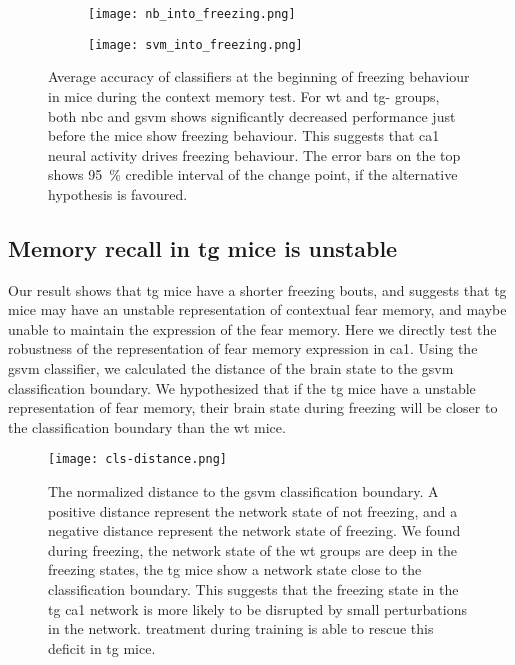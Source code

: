\begin{figure}[h]
    \begin{subfigure}[h]{\textwidth}
        \texttt{[image: nb\_into\_freezing.png]}
        \caption{\label{f.ad.nb_into_f}}
    \end{subfigure}
    \begin{subfigure}[h]{\textwidth}
        \texttt{[image: svm\_into\_freezing.png]}
        \caption{\label{f.ad.svm_into_f}}
    \end{subfigure}
    \caption[Average accuracy of classifiers at initiation of freezing behaviour.]{Average accuracy of classifiers at the beginning of freezing behaviour in mice during the context memory test. For \gls{wt} and \gls{tg}-\glu{} groups, both \gls{nbc} and \gls{gsvm} shows significantly decreased performance just before the mice show freezing behaviour. This suggests that \gls{ca1} neural activity drives freezing behaviour. The error bars on the top shows \SI{95}{\percent} credible interval of the change point, if the alternative hypothesis is favoured. \label{f.ad.into_f}}
\end{figure}

\subsection{Memory recall in \gls{tg} mice is unstable}
Our result shows that \gls{tg} mice have a shorter freezing bouts, and suggests that \gls{tg} mice may have an unstable representation of contextual fear memory, and maybe unable to maintain the expression of the fear memory. Here we directly test the robustness of the representation of fear memory expression in \gls{ca1}. Using the \gls{gsvm} classifier, we calculated the distance of the brain state to the \gls{gsvm} classification boundary. We hypothesized that if the \gls{tg} mice have a unstable representation of fear memory, their brain state during freezing will be closer to the classification boundary than the \gls{wt} mice. 

\begin{figure}[h]
    \texttt{[image: cls-distance.png]}
    \caption[Normalized distance to the \gls{gsvm} classification boundary.]{The normalized distance to the \gls{gsvm} classification boundary. A positive distance represent the network state of not freezing, and a negative distance represent the network state of freezing. We found during freezing, the network state of the \gls{wt} groups are deep in the freezing states, the \gls{tg} mice show a network state close to the classification boundary. This suggests that the freezing state in the \gls{tg} \gls{ca1} network is more likely to be disrupted by small perturbations in the network. \tglu{} treatment during training is able to rescue this deficit in \gls{tg} mice. \label{f.ad.cls-distance}}
\end{figure}

